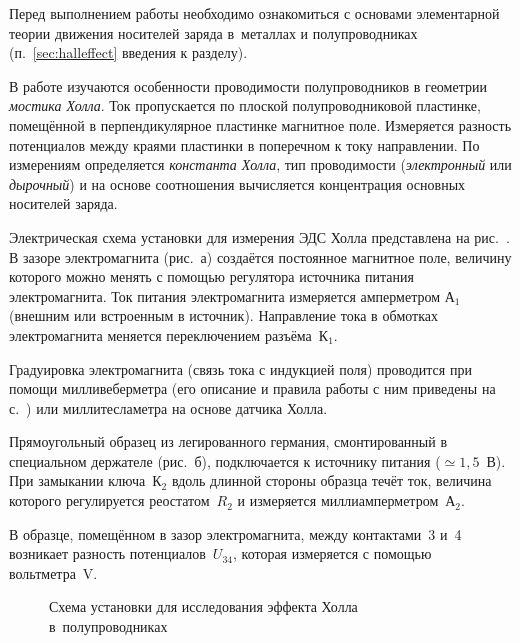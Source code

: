 


Перед выполнением работы необходимо ознакомиться с основами
элементарной теории движения носителей заряда в~металлах и полупроводниках
(п.~\ref{sec:halleffect} введения к разделу).


В работе изучаются особенности проводимости полупроводников
в геометрии \emph{мостика Холла}.
Ток пропускается по плоской полупроводниковой пластинке, 
помещённой в перпендикулярное пластинке магнитное поле.
Измеряется разность потенциалов между краями пластинки в поперечном
к току направлении. По измерениям определяется \emph{константа Холла},
тип проводимости (\emph{электронный} или \emph{дырочный}) и на основе
соотношения  вычисляется концентрация основных
носителей заряда.

\experiment

Электрическая схема установки для измерения ЭДС Холла представлена
на рис.~. В зазоре электромагнита (рис.~а) 
создаётся постоянное магнитное поле, величину которого можно менять с помощью 
регулятора источника питания электромагнита. Ток питания электромагнита 
измеряется амперметром А$_1$ (внешним или встроенным в источник).
Направление тока в обмотках электромагнита меняется переключением
разъёма~К$_1$.

Градуировка электромагнита (связь тока с индукцией поля) проводится 
при помощи милливеберметра (его описание и правила работы 
с ним приведены на с.~\pageref{MWB}) или миллитесламетра на основе
датчика Холла.

Прямоугольный образец из легированного германия, смонтированный в специальном держателе
(рис.~б), подключается к источнику питания ($\simeq 1,5$~В). При
замыкании ключа~К$_2$ вдоль длинной стороны образца течёт ток, величина которого
регулируется реостатом~$R_2$ и измеряется миллиамперметром~А$_2$.

В образце, помещённом в зазор электромагнита, между 
контактами~3 и~4 возникает разность потенциалов~$U_{34}$, 
которая измеряется с помощью вольтметра~V.

\begin{figure}[h!]
    \centering
    \caption{Схема установки для исследования эффекта Холла в~полупроводниках}
\end{figure}
\pagebreak

